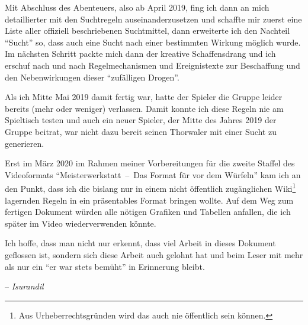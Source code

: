 Mit Abschluss des Abenteuers, also ab April 2019, fing ich dann an mich detaillierter mit den Suchtregeln auseinanderzusetzen und schaffte mir zuerst eine Liste aller offiziell beschriebenen Suchtmittel, dann erweiterte ich den Nachteil \enquote{Sucht} so, dass auch eine Sucht nach einer bestimmten Wirkung möglich wurde. Im nächsten Schritt packte mich dann der kreative Schaffensdrang und ich erschuf nach und nach Regelmechanismen und Ereignistexte zur Beschaffung und den Nebenwirkungen dieser \enquote{zufälligen Drogen}.

Als ich Mitte Mai 2019 damit fertig war, hatte der Spieler die Gruppe leider bereits (mehr oder weniger) verlassen. Damit konnte ich diese Regeln nie am Spieltisch testen und auch ein neuer Spieler, der Mitte des Jahres 2019 der Gruppe beitrat, war nicht dazu bereit seinen Thorwaler mit einer Sucht zu generieren.

Erst im März 2020 im Rahmen meiner Vorbereitungen für die zweite Staffel des Videoformats \enquote{Meisterwerkstatt~--~Das Format für vor dem Würfeln} kam ich an den Punkt, dass ich die bislang nur in einem nicht öffentlich zugänglichen Wiki\footnote{Aus Urheberrechtsgründen wird das auch nie öffentlich sein können.} lagernden Regeln in ein präsentables Format bringen wollte. Auf dem Weg zum fertigen Dokument würden alle nötigen Grafiken und Tabellen anfallen, die ich später im Video wiederverwenden könnte.

Ich hoffe, dass man nicht nur erkennt, dass viel Arbeit in dieses Dokument geflossen ist, sondern sich diese Arbeit auch gelohnt hat und beim Leser mit mehr als nur ein \enquote{er war stets bemüht} in Erinnerung bleibt.

\bigskip\noindent
{\raggedleft-- \emph{Isurandil}\par}

